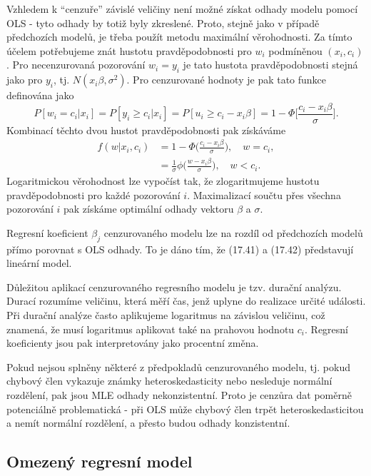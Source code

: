 Vzhledem k ``cenzuře'' závislé veličiny není možné získat odhady modelu pomocí OLS - tyto odhady by totiž byly zkreslené. Proto, stejně jako v případě předchozích modelů, je třeba použít metodu maximální věrohodnosti. Za tímto účelem potřebujeme znát hustotu pravděpodobnosti pro $w_i$ podmíněnou $(x_i, c_i)$. Pro necenzurovaná pozorování $w_i = y_i$ je tato hustota pravděpodobnosti stejná jako pro $y_i$, tj. $N(x_i\beta, \sigma^2)$. Pro cenzurované hodnoty je pak tato funkce definována jako
\begin{equation}
P[w_i = c_i|x_i] = P[y_i \ge c_i | x_i] = P[u_i \ge c_i - x_i \beta] = 1 - \Phi\Big[\frac{c_i - x_i \beta}{\sigma}\Big].
\end{equation}
Kombinací těchto dvou hustot pravděpodobnosti pak získáváme
\begin{equation}
\begin{split}
f(w|x_i, c_i) & = 1 - \Phi\Big(\frac{c_i - x_i \beta}{\sigma}\Big), \quad w = c_i,\\
 & = \frac{1}{\sigma} \phi\Big(\frac{w - x_i \beta}{\sigma}\Big), \quad w < c_i.
\end{split}
\end{equation}
Logaritmickou věrohodnost lze vypočíst tak, že zlogaritmujeme hustotu pravděpodobnosti pro každé pozorování $i$. Maximalizací součtu přes všechna pozorování $i$ pak získáme optimální odhady vektoru $\beta$ a $\sigma$.

Regresní koeficient $\beta_j$ cenzurovaného modelu lze na rozdíl od předchozích modelů přímo porovnat s OLS odhady. To je dáno tím, že (17.41) a (17.42) představují lineární model.

Důležitou aplikací cenzurovaného regresního modelu je tzv. durační analýzu. Durací rozumíme veličinu, která měří čas, jenž uplyne do realizace určité události. Při durační analýze často aplikujeme logaritmus na závislou veličinu, což znamená, že musí logaritmus aplikovat také na prahovou hodnotu $c_i$. Regresní koeficienty jsou pak interpretovány jako procentní změna.

Pokud nejsou splněny některé z předpokladů cenzurovaného modelu, tj. pokud chybový člen vykazuje známky heteroskedasticity nebo nesleduje normální rozdělení, pak jsou MLE odhady nekonzistentní. Proto je cenzůra dat poměrně potenciálně problematická - při OLS může chybový člen trpět heteroskedasticitou a nemít normální rozdělení, a přesto budou odhady konzistentní.

\subsection{Omezený regresní model}

